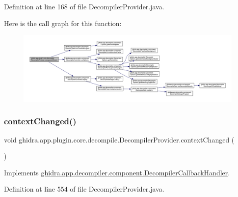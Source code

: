 Definition at line 168 of file Decompiler\+Provider.\+java.

Here is the call graph for this function\+:
\nopagebreak
\begin{figure}[H]
\begin{center}
\leavevmode
\includegraphics[width=350pt]{classghidra_1_1app_1_1plugin_1_1core_1_1decompile_1_1_decompiler_provider_ad7dcdde0bae93b40f4d6acca9f90a139_cgraph}
\end{center}
\end{figure}
\mbox{\label{classghidra_1_1app_1_1plugin_1_1core_1_1decompile_1_1_decompiler_provider_a3a75d45714ac350137e8a1cef08a2241}} 
\subsubsection{\texorpdfstring{contextChanged()}{contextChanged()}}
{\footnotesize\ttfamily void ghidra.\+app.\+plugin.\+core.\+decompile.\+Decompiler\+Provider.\+context\+Changed (\begin{DoxyParamCaption}{ }\end{DoxyParamCaption})\hspace{0.3cm}{\ttfamily [inline]}}



Implements \mbox{\hyperlink{interfaceghidra_1_1app_1_1decompiler_1_1component_1_1_decompiler_callback_handler_ae908ba10bddcb8d863eae48d8f1887a0}{ghidra.\+app.\+decompiler.\+component.\+Decompiler\+Callback\+Handler}}.



Definition at line 554 of file Decompiler\+Provider.\+java.

